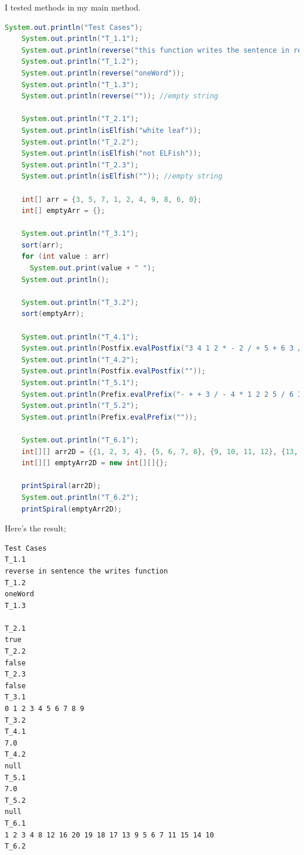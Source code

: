 \documentclass[a4paper]{article}
\begin{document}
\begin{large}
  I tested methods in my main method.
  
  \begin{lstlisting}[language=Java, caption=Testing methods in main method]
    System.out.println("Test Cases");
    System.out.println("T_1.1");
    System.out.println(reverse("this function writes the sentence in reverse"));
    System.out.println("T_1.2");
    System.out.println(reverse("oneWord"));
    System.out.println("T_1.3");
    System.out.println(reverse("")); //empty string

    System.out.println("T_2.1");
    System.out.println(isElfish("white leaf"));
    System.out.println("T_2.2");
    System.out.println(isElfish("not ELFish"));
    System.out.println("T_2.3");
    System.out.println(isElfish("")); //empty string

    int[] arr = {3, 5, 7, 1, 2, 4, 9, 8, 6, 0};
    int[] emptyArr = {};

    System.out.println("T_3.1");
    sort(arr);
    for (int value : arr)
      System.out.print(value + " ");
    System.out.println();

    System.out.println("T_3.2");
    sort(emptyArr);

    System.out.println("T_4.1");
    System.out.println(Postfix.evalPostfix("3 4 1 2 * - 2 / + 5 + 6 3 / -"));
    System.out.println("T_4.2");
    System.out.println(Postfix.evalPostfix(""));
    System.out.println("T_5.1");
    System.out.println(Prefix.evalPrefix("- + + 3 / - 4 * 1 2 2 5 / 6 3"));
    System.out.println("T_5.2");
    System.out.println(Prefix.evalPrefix(""));

    System.out.println("T_6.1");
    int[][] arr2D = {{1, 2, 3, 4}, {5, 6, 7, 8}, {9, 10, 11, 12}, {13, 14, 15, 16}, {17, 18, 19, 20}};
    int[][] emptyArr2D = new int[][]{};

    printSpiral(arr2D);
    System.out.println("T_6.2");
    printSpiral(emptyArr2D);
  \end{lstlisting}

  \newpage

  Here's the result;

  \begin{small}
    \begin{verbatim}
Test Cases
T_1.1
reverse in sentence the writes function
T_1.2
oneWord
T_1.3

T_2.1
true
T_2.2
false
T_2.3
false
T_3.1
0 1 2 3 4 5 6 7 8 9 
T_3.2
T_4.1
7.0
T_4.2
null
T_5.1
7.0
T_5.2
null
T_6.1
1 2 3 4 8 12 16 20 19 18 17 13 9 5 6 7 11 15 14 10 
T_6.2

    \end{verbatim}
  \end{small}
  




\end{large}
\end{document}
